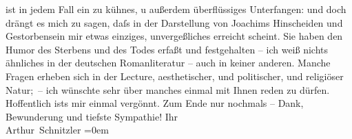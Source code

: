 \begin{ledgroupsized}[t]{13cm}
               ist in jedem Fall ein zu kühnes, u außerdem überflüssiges Unterfangen: und doch
               drängt es mich zu sagen, daſs in der Darstellung von Joachims Hinscheiden und Gestorbensein mir etwas einziges,
               unvergeßliches erreicht scheint. Sie haben den Humor des Sterbens und des Todes
               erfaßt und festgehalten – ich weiß nichts ähnliches in der deutschen Romanliteratur –
               auch in keiner anderen.\pend
           \pstart
           Manche Fragen erheben sich in der Lecture, aesthetischer, und politischer, und
               religiöser Natur; – ich wünschte sehr über manches einmal mit Ihnen reden zu dürfen.
               Hoffentlich ists mir einmal vergönnt. Zum Ende nur nochmals – Dank, Bewunderung und
               tiefste Sympathie!\pend
           \pstart
           Ihr{\\[\baselineskip]}\spacefill\mbox{Arthur Schnitzler}\pend
           \leftskip=0em{}
         
         \endnumbering{}\end{ledgroupsized}  \newcommand{\dateiname}{L02429}\newcommand{\titel}{Arthur Schnitzler an Thomas Mann, 5. 1. 1925}\newcommand{\editorInnen}{Martin Anton Müller und Gerd-Hermann Susen}
      